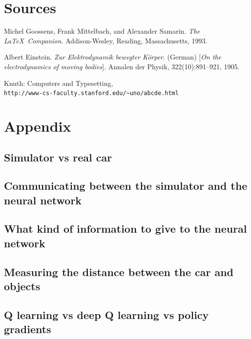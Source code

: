 \documentclass{article}
\begin{document}
\section{Sources}

\begin{thebibliography}{9}
Michel Goossens, Frank Mittelbach, and Alexander Samarin. 
\textit{The \LaTeX\ Companion}. 
Addison-Wesley, Reading, Massachusetts, 1993.
 
Albert Einstein. 
\textit{Zur Elektrodynamik bewegter K{\"o}rper}. (German) 
[\textit{On the electrodynamics of moving bodies}]. 
Annalen der Physik, 322(10):891–921, 1905.
 
Knuth: Computers and Typesetting,
\\\texttt{http://www-cs-faculty.stanford.edu/\~{}uno/abcde.html}
\end{thebibliography}

\section{Appendix}
\subsection{Simulator vs real car}
\subsection{Communicating between the simulator and the neural network}
\subsection{What kind of information to give to the neural network}
\subsection{Measuring the distance between the car and objects}
\subsection{Q learning vs deep Q learning vs policy gradients}
\end{document}
